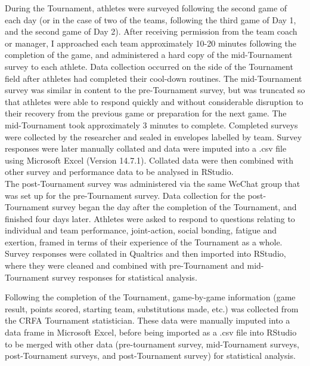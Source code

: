 During the Tournament, athletes were surveyed following the second game of each day (or in the case of two of the teams, following the third game of Day 1, and the second game of Day 2).  After receiving permission from the team coach or manager, I approached each team approximately 10-20 minutes following the completion of the game, and administered a hard copy of the mid-Tournament survey to each athlete.  Data collection occurred on the side of the Tournament field after athletes had completed their cool-down routines. The mid-Tournament survey was similar in content to the pre-Tournament survey, but was  truncated so that athletes were able to respond quickly and without considerable disruption to their recovery from the previous game or preparation for the next game. The mid-Tournament took approximately 3 minutes to complete. Completed surveys were collected by the researcher and sealed in envelopes labelled by team.  Survey responses were later manually collated and data were imputed into a .csv file using Microsoft Excel (Version 14.7.1). Collated data were then combined with other survey and performance data to be analysed in RStudio. \\



The post-Tournament survey was administered via the same WeChat group that was set up for the pre-Tournament survey. Data collection for the post-Tournament survey began the day after the completion of the Tournament, and finished four days later. Athletes were asked to respond to questions relating to individual and team performance, joint-action, social bonding, fatigue and exertion, framed in terms of their experience of the Tournament as a whole. Survey responses were collated in Qualtrics and then imported into RStudio, where they were cleaned and combined with pre-Tournament and mid-Tournament survey responses for statistical analysis.



Following the completion of the Tournament, game-by-game information (game result, points scored, starting team, substitutions made, etc.) was collected from the CRFA Tournament statistician. These data were manually imputed into a data frame in Microsoft Excel, before being imported as a .csv file into RStudio to be merged with other data (pre-tournament survey, mid-Tournament surveys, post-Tournament surveys, and post-Tournament survey) for statistical analysis.














